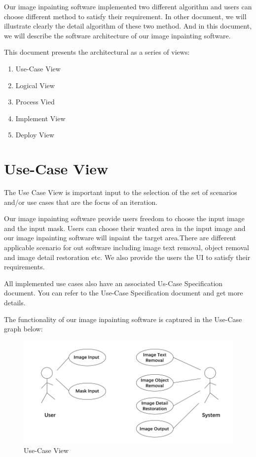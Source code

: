 Our image inpainting software implemented two different algorithm and users can choose different method to satisfy their requirement. In other document, we will illustrate clearly the detail algorithm of these two method. And in this document, we will describe the software architecture of our image inpainting software.

This document presents the architectural as a series of views:

\begin{enumerate}
	\item Use-Case View
	\item Logical View
	\item Process Vied
	\item Implement View
	\item Deploy View
\end{enumerate}


\section{Use-Case View}
\qquad The Use Case View is important input to the selection of the set of scenarios and/or use cases that are the focus of an iteration. 

Our image inpainting software provide users freedom to choose the input image and the input mask. Users can choose their wanted area in the input image and our image inpainting software will inpaint the target area.There are different applicable scenario for out software including image text removal, object removal and image detail restoration etc. We also provide the users the UI to satisfy their requirements. 

All implemented use cases also have an associated Us-Case Specification document. You can refer to the Use-Case Specification document and get more details.

The functionality of our image inpainting software is captured in the Use-Case graph below:
\begin{figure}[H]
	\centering
	\includegraphics[width=1.0\linewidth]{use-case.jpg}
	\caption{Use-Case View}
\end{figure}

